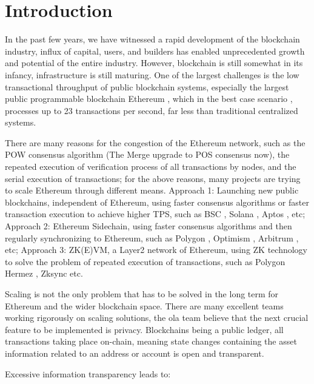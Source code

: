 \section{Introduction}\label{sec:introduction}

In the past few years, we have witnessed a rapid development of the blockchain industry, influx of capital, users, and builders has enabled unprecedented growth and potential of the entire industry. However, blockchain is still somewhat in its infancy, infrastructure is still maturing. One of the largest challenges is the low transactional throughput of public blockchain systems, especially the largest public programmable blockchain Ethereum \cite{website:Ethereum}, which in the best case scenario \cite{website:Etherscan-chart}, processes up to 23 transactions per second, far less than traditional centralized systems. 

There are many reasons for the congestion of the Ethereum network, such as the POW \cite{website:POW} consensus algorithm (The Merge upgrade \cite{website:The-Merge} to POS \cite{website:POS} consensus now), the repeated execution of verification process of all transactions by nodes, and the serial execution of transactions; for the above reasons, many projects are trying to scale Ethereum through different means. Approach 1: Launching new public blockchains, independent of Ethereum, using faster consensus algorithms or faster transaction execution to achieve higher TPS, such as BSC \cite{website:BSC}, Solana \cite{website:Solana}, Aptos \cite{website:Aptos}, etc; Approach 2: Ethereum Sidechain, using faster consensus algorithms and then regularly synchronizing to Ethereum, such as Polygon \cite{website:Polygon}, Optimism \cite{website:Optimism}, Arbitrum \cite{website:Arbitrum}, etc; Approach 3: ZK(E)VM, a Layer2 network of Ethereum, using ZK technology to solve the problem of repeated execution of transactions, such as Polygon Hermez \cite{website:Polygon-Hermez}, Zksync \cite{website:Zksync} etc.

Scaling is not the only problem that has to be solved in the long term for Ethereum and the wider blockchain space. There are many excellent teams working rigorously on scaling solutions, the ola team believe that the next crucial feature to be implemented is privacy. Blockchains being a public ledger, all transactions taking place on-chain, meaning state changes containing the asset information related to an address or account is open and transparent. 

Excessive information transparency leads to: 

